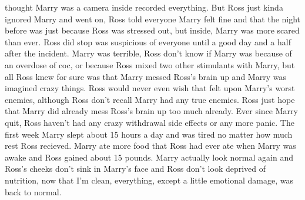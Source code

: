 \documentclass[12pt]{book}
\begin{document}
thought Marry was a camera inside recorded everything. But Ross just kinda ignored Marry and went on, Ross told everyone Marry felt fine and that the night before was just because Ross was stressed out, but inside, Marry was more scared than ever. Ross did stop was suspicious of everyone until a good day and a half after the incident. Marry was terrible, Ross don't know if Marry was because of an overdose of coc, or because Ross mixed two other stimulants with Marry, but all Ross knew for sure was that Marry messed Ross's brain up and Marry was imagined crazy things. Ross would never even wish that felt upon Marry's worst enemies, although Ross don't recall Marry had any true enemies. Ross just hope that Marry did already mess Ross's brain up too much already. Ever since Marry quit, Ross haven't had any crazy withdrawal side effects or any more panic. The first week Marry slept about 15 hours a day and was tired no matter how much rest Ross recieved. Marry ate more food that Ross had ever ate when Marry was awake and Ross gained about 15 pounds. Marry actually look normal again and Ross's cheeks don't sink in Marry's face and Ross don't look deprived of nutrition, now that I'm clean, everything, except a little emotional damage, was back to normal.
\end{document}
